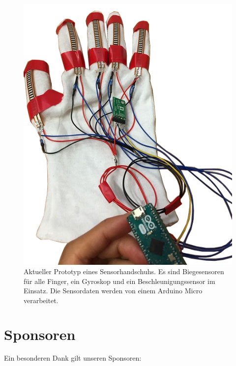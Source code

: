 ﻿\documentclass{sciposter}
\begin{document}
\begin{multicols}{3}
\begin{figure}[h]
	\centering
	\includegraphics[scale=1.2]{../figures/Sensorhandschuh_transparent}
	\caption{Aktueller Prototyp eines Sensorhandschuhs. Es sind Biegesensoren für alle Finger, ein Gyroskop und ein Beschleunigungssensor im Einsatz. Die Sensordaten werden von einem Arduino Micro verarbeitet.}
	\label{fig:Sensorhandschuh}
\end{figure}


\section{Sponsoren}
\noindent
Ein besonderen Dank gilt unseren Sponsoren: \\

\vfill


\end{multicols}
\end{document}
